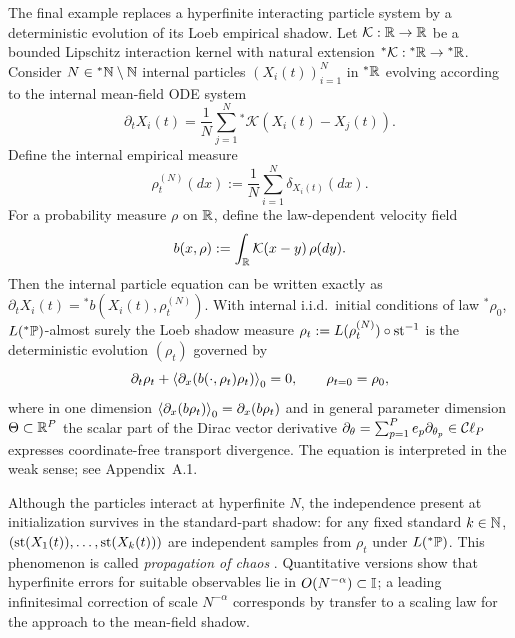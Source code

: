The final example replaces a hyperfinite interacting particle system by a deterministic evolution of its Loeb empirical shadow. Let $\mathcal{K} : \mathbb{R} \to \mathbb{R}$ be a bounded Lipschitz interaction kernel with natural extension ${}^*\mathcal{K} : {}^*\mathbb{R} \to {}^*\mathbb{R}$. Consider $N \in {}^*\mathbb{N} \setminus \mathbb{N}$ internal particles $(X_i(t))_{i=1}^N$ in ${}^*\mathbb{R}$ evolving according to the internal mean-field ODE system
\begin{equation}\label{eq:1.8}
\partial_t X_i(t) = \frac{1}{N}\sum_{j=1}^N {}^*\mathcal{K}\!\left(X_i(t) - X_j(t)\right).
\end{equation}
Define the internal empirical measure
\begin{equation}\label{eq:1.9}
\rho_t^{(N)}(dx) := \frac{1}{N}\sum_{i=1}^N \delta_{X_i(t)}(dx).
\end{equation}
For a probability measure $\rho$ on $\mathbb{R}$, define the law-dependent velocity field
\begin{equation}\label{eq:1.10}
b(x, \rho) := \int_{\mathbb{R}} \mathcal{K}(x - y)\,\rho(dy).
\end{equation}
Then the internal particle equation can be written exactly as $\partial_t X_i(t) = {}^*b(X_i(t), \rho_t^{(N)})$. With internal i.i.d.\ initial conditions of law ${}^*\rho_0$, $L({}^*\mathbb{P})$-almost surely the Loeb shadow measure $\rho_t := L(\rho_t^{(N)}) \circ \operatorname{st}^{-1}$ is the deterministic evolution $(\rho_t)$ governed by
\begin{equation}\label{eq:1.11}
\partial_t \rho_t + \left\langle \partial_x\!\left(b(\cdot, \rho_t)\rho_t\right) \right\rangle_0 = 0, \qquad \rho_{t=0} = \rho_0,
\end{equation}
where in one dimension $\left\langle \partial_x(b\rho_t) \right\rangle_0 = \partial_x(b\rho_t)$ and in general parameter dimension $\Theta \subset \mathbb{R}^P$ the scalar part of the Dirac vector derivative $\partial_\theta = \sum_{p=1}^P e_p \partial_{\theta_p} \in \mathcal{C}\ell_P$ expresses coordinate-free transport divergence. The equation is interpreted in the weak sense; see Appendix~A.1.

Although the particles interact at hyperfinite $N$, the independence present at initialization survives in the standard-part shadow: for any fixed standard $k \in \mathbb{N}$, $(\operatorname{st}(X_1(t)), \dots, \operatorname{st}(X_k(t)))$ are independent samples from $\rho_t$ under $L({}^*\mathbb{P})$. This phenomenon is called \emph{propagation of chaos} \cite{sznitman1991topics}. Quantitative versions show that hyperfinite errors for suitable observables lie in $O(N^{-\alpha}) \subset \mathbb{I}$; a leading infinitesimal correction of scale $N^{-\alpha}$ corresponds by transfer to a scaling law for the approach to the mean-field shadow.

